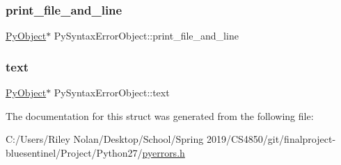 \subsubsection{\texorpdfstring{print\_file\_and\_line}{print\_file\_and\_line}}
{\footnotesize\ttfamily \mbox{\hyperlink{_python27_2object_8h_aadc84ac7aed2cfa6f20c25f62bf3dac7}{Py\+Object}}$\ast$ Py\+Syntax\+Error\+Object\+::print\+\_\+file\+\_\+and\+\_\+line}

\mbox{\label{struct_py_syntax_error_object_aebd47dd29210b4107549874ee2253ede}} 
\subsubsection{\texorpdfstring{text}{text}}
{\footnotesize\ttfamily \mbox{\hyperlink{_python27_2object_8h_aadc84ac7aed2cfa6f20c25f62bf3dac7}{Py\+Object}}$\ast$ Py\+Syntax\+Error\+Object\+::text}



The documentation for this struct was generated from the following file\+:\begin{DoxyCompactItemize}
\item 
C\+:/\+Users/\+Riley Nolan/\+Desktop/\+School/\+Spring 2019/\+C\+S4850/git/finalproject-\/bluesentinel/\+Project/\+Python27/\mbox{\hyperlink{pyerrors_8h}{pyerrors.\+h}}\end{DoxyCompactItemize}

